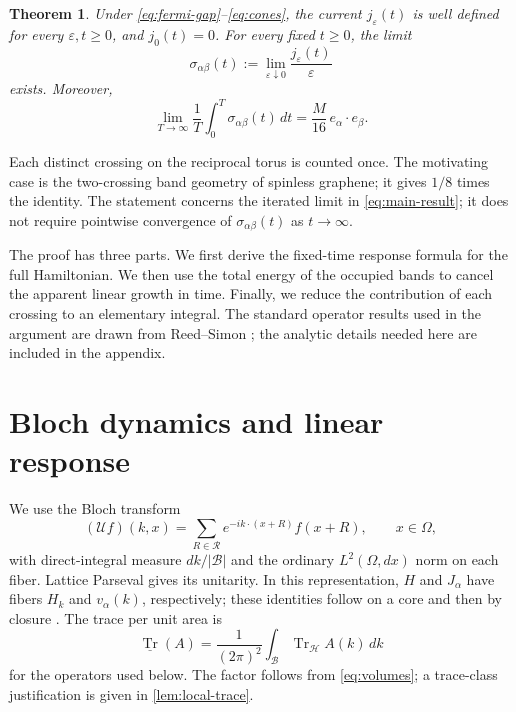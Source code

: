 \documentclass[11pt,a4paper]{article}
\newcommand{\B}{\mathcal B}
\newcommand{\lat}{\mathcal R}
\newcommand{\HH}{\mathscr H}
\newcommand{\trv}{\underline{\operatorname{Tr}}}
\newcommand{\cB}{\frac{1}{(2\pi)^2}}
\DeclareMathOperator{\Tr}{Tr}
\newtheorem{theorem}{Theorem}[section]
\numberwithin{equation}{section}
\begin{document}
\begin{theorem}\label{thm:main}
Under \eqref{eq:fermi-gap}--\eqref{eq:cones}, the current
$j_\varepsilon(t)$ is well defined for every $\varepsilon,t\geq0$, and
$j_0(t)=0$. For every fixed $t\geq0$, the limit
\[
 \sigma_{\alpha\beta}(t)
 :=\lim_{\varepsilon\downarrow0}\frac{j_\varepsilon(t)}{\varepsilon}
\]
exists. Moreover,
\begin{equation}\label{eq:main-result}
 \lim_{T\longrightarrow\infty}\frac1T\int_0^T
 \sigma_{\alpha\beta}(t)\,dt
 =\frac{M}{16}\,e_\alpha\cdot e_\beta.
\end{equation}
\end{theorem}

Each distinct crossing on the reciprocal torus is counted once. The
motivating case is the two-crossing band geometry of spinless graphene;
it gives $1/8$ times the identity. The
statement concerns the iterated limit in \eqref{eq:main-result}; it does
not require pointwise convergence of $\sigma_{\alpha\beta}(t)$ as
$t\to\infty$.

The proof has three parts. We first derive the fixed-time response formula
for the full Hamiltonian. We then use the total energy of
the occupied bands to cancel the apparent linear growth in time. Finally,
we reduce the contribution of each crossing to an elementary integral.
The standard operator results used in the argument are drawn from
Reed--Simon \cite{RS1,RS2,RS4}; the analytic details needed here are
included in the appendix.

\section{Bloch dynamics and linear response}\label{sec:response}

We use the Bloch transform
\begin{equation}\label{eq:bloch-transform}
 (\mathcal U f)(k,x)
 =\sum_{R\in\lat}e^{-ik\cdot(x+R)}f(x+R),
 \qquad x\in\Omega,
\end{equation}
with direct-integral measure $dk/|\B|$ and the ordinary $L^2(\Omega,dx)$
norm on each fiber. Lattice Parseval gives its unitarity. In this
representation, $H$ and $J_\alpha$ have fibers $H_k$ and $v_\alpha(k)$,
respectively; these identities follow on a core and then by closure
\cite[Theorem XIII.97]{RS4}. The trace per unit area is
\begin{equation}\label{eq:bloch-trace}
 \trv(A)=\cB\int_\B\Tr_{\HH}A(k)\,dk
\end{equation}
for the operators used below. The factor follows from
\eqref{eq:volumes}; a trace-class justification is given in
\cref{lem:local-trace}.
\end{document}
